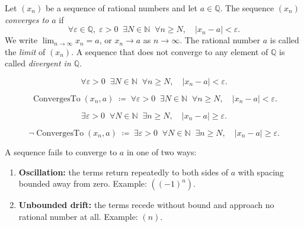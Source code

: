 \begin{tcolorbox}[colback=defbox, colframe=defborder, arc=2pt,
  left=6pt, right=6pt, top=4pt, bottom=4pt,
  title={\small\textbf{Definition (Convergence of a Rational Sequence)}},
  fonttitle=\small\bfseries]
\begin{definition}
\label{def:convergent-rational-sequence}
Let $(x_n)$ be a sequence of rational numbers and let $a \in \mathbb{Q}$.
The sequence $(x_n)$ \emph{converges to $a$} if
\[
\forall \varepsilon \in \mathbb{Q},\; \varepsilon > 0 \;\;
\exists N \in \mathbb{N} \;\;
\forall n \geq N, \quad |x_n - a| < \varepsilon.
\]
We write $\lim_{n \to \infty} x_n = a$, or $x_n \to a$ as $n \to \infty$.
The rational number $a$ is called the \emph{limit} of $(x_n)$.
A sequence that does not converge to any element of $\mathbb{Q}$ is
called \emph{divergent in $\mathbb{Q}$}.
\end{definition}
\end{tcolorbox}

\begin{remark*}
\[
\forall \varepsilon > 0 \;\; \exists N \in \mathbb{N} \;\; \forall n \geq N,
\quad |x_n - a| < \varepsilon.
\]
\end{remark*}

\begin{remark*}
\[
\operatorname{ConvergesTo}(x_n, a)
\;\coloneqq\;
\forall \varepsilon > 0 \;\; \exists N \in \mathbb{N} \;\; \forall n \geq N,
\quad |x_n - a| < \varepsilon.
\]
\end{remark*}

\begin{remark*}
\[
\exists \varepsilon > 0 \;\; \forall N \in \mathbb{N} \;\; \exists n \geq N,
\quad |x_n - a| \geq \varepsilon.
\]
\end{remark*}

\begin{remark*}
\[
\neg\operatorname{ConvergesTo}(x_n, a)
\;\coloneqq\;
\exists \varepsilon > 0 \;\; \forall N \in \mathbb{N} \;\; \exists n \geq N,
\quad |x_n - a| \geq \varepsilon.
\]
\end{remark*}

\begin{remark*}
A sequence fails to converge to $a$ in one of two ways:
\begin{enumerate}
  \item \textbf{Oscillation:} the terms return repeatedly to both sides of $a$
        with spacing bounded away from zero.  Example: $((-1)^n)$.
  \item \textbf{Unbounded drift:} the terms recede without bound and approach
        no rational number at all.  Example: $(n)$.
\end{enumerate}
\end{remark*}

